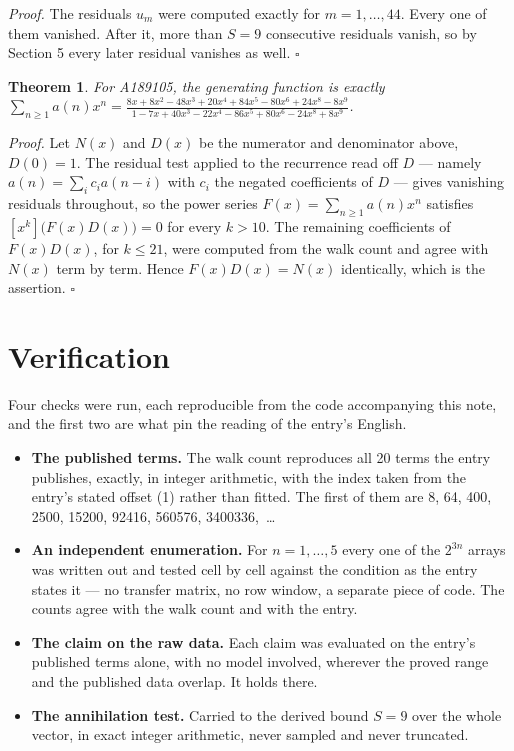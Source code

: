 \documentclass[11pt]{article}
\newtheorem{theorem}{Theorem}
\theoremstyle{definition}
\begin{document}
{\itshape Proof.} The residuals $u_m$ were computed exactly for $m = 1,\dots,44$. Every one of them vanished. After it, more than $S = 9$ consecutive residuals vanish, so by Section 5 every later residual vanishes as well. $\square$

\begin{theorem} For A189105, the generating function is exactly $\sum_{n\ge 1} a(n)x^n = \frac{8x + 8x^{2} - 48x^{3} + 20x^{4} + 84x^{5} - 80x^{6} + 24x^{8} - 8x^{9}}{1 - 7x + 40x^{3} - 22x^{4} - 86x^{5} + 80x^{6} - 24x^{8} + 8x^{9}}$.\end{theorem}

{\itshape Proof.} Let $N(x)$ and $D(x)$ be the numerator and denominator above, $D(0)=1$. The residual test applied to the recurrence read off $D$ --- namely $a(n) = \sum_i c_i a(n-i)$ with $c_i$ the negated coefficients of $D$ --- gives vanishing residuals throughout, so the power series $F(x)=\sum_{n\ge 1}a(n)x^n$ satisfies $[x^k]\bigl(F(x)D(x)\bigr) = 0$ for every $k > 10$. The remaining coefficients of $F(x)D(x)$, for $k \le 21$, were computed from the walk count and agree with $N(x)$ term by term. Hence $F(x)D(x) = N(x)$ identically, which is the assertion. $\square$

\section{Verification}

Four checks were run, each reproducible from the code accompanying this note, and the first two are what pin the reading of the entry's English.

\begin{itemize}

\item {\bfseries The published terms.} The walk count reproduces all 20 terms the entry publishes, exactly, in integer arithmetic, with the index taken from the entry's stated offset (1) rather than fitted. The first of them are 8, 64, 400, 2500, 15200, 92416, 560576, 3400336,~\dots

\item {\bfseries An independent enumeration.} For $n = 1,\dots,5$ every one of the $2^{3n}$ arrays was written out and tested cell by cell against the condition as the entry states it --- no transfer matrix, no row window, a separate piece of code. The counts agree with the walk count and with the entry.

\item {\bfseries The claim on the raw data.} Each claim was evaluated on the entry's published terms alone, with no model involved, wherever the proved range and the published data overlap. It holds there.

\item {\bfseries The annihilation test.} Carried to the derived bound $S = 9$ over the whole vector, in exact integer arithmetic, never sampled and never truncated.

\end{itemize}
\end{document}
